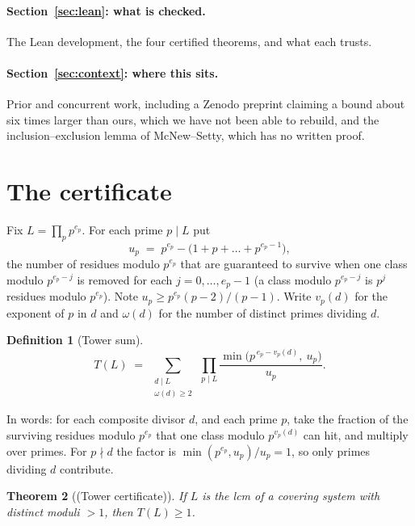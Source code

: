 \documentclass[11pt]{article}
\newtheorem{theorem}{Theorem}
\theoremstyle{definition}
\newtheorem{definition}[theorem]{Definition}
\theoremstyle{remark}
\newcommand{\moniker}[1]{\textup{(#1)}}
\begin{document}
\paragraph{Section~\ref{sec:lean}: what is checked.} The Lean development, the four certified theorems, and what each trusts.

\paragraph{Section~\ref{sec:context}: where this sits.} Prior and concurrent work, including a Zenodo preprint claiming a bound about six times larger than ours, which we have not been able to rebuild, and the inclusion--exclusion lemma of McNew--Setty, which has no written proof.

\section{The certificate}\label{sec:certificate}

Fix $L = \prod_p p^{e_p}$. For each prime $p \mid L$ put
\[
u_p \;=\; p^{e_p} - \bigl(1 + p + \dots + p^{e_p - 1}\bigr),
\]
the number of residues modulo $p^{e_p}$ that are guaranteed to survive when one class modulo $p^{e_p - j}$ is removed for each $j = 0, \dots, e_p - 1$ (a class modulo $p^{e_p-j}$ is $p^{j}$ residues modulo $p^{e_p}$). Note $u_p \ge p^{e_p}(p-2)/(p-1)$. Write $v_p(d)$ for the exponent of $p$ in $d$ and $\omega(d)$ for the number of distinct primes dividing $d$.

\begin{definition}[Tower sum]
\[
T(L) \;=\; \sum_{\substack{d \mid L \\ \omega(d) \ge 2}}\ \prod_{p \mid L} \frac{\min\!\bigl(p^{\,e_p - v_p(d)},\ u_p\bigr)}{u_p}.
\]
\end{definition}

In words: for each composite divisor $d$, and each prime $p$, take the fraction of the surviving residues modulo $p^{e_p}$ that one class modulo $p^{v_p(d)}$ can hit, and multiply over primes. For $p \nmid d$ the factor is $\min(p^{e_p}, u_p)/u_p = 1$, so only primes dividing $d$ contribute.

\begin{theorem}[\moniker{Tower certificate}]\label{thm:tower}
If $L$ is the lcm of a covering system with distinct moduli $> 1$, then $T(L) \ge 1$.
\end{theorem}
\end{document}
